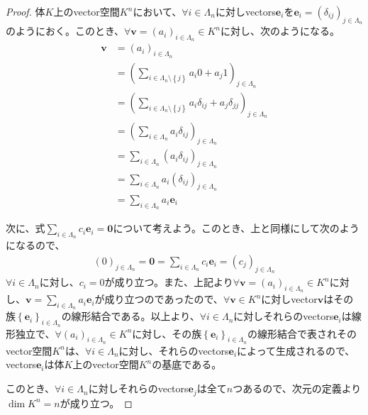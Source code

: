 \documentclass[dvipdfmx]{jsarticle}
\begin{document}
\begin{proof}
体$K$上のvector空間$K^{n}$において、$\forall i \in \varLambda_{n}$に対しvectors$\mathbf{e}_{i}$を$\mathbf{e}_{i} = \left( \delta_{ij} \right)_{j \in \varLambda_{n}}$のようにおく。このとき、$\forall\mathbf{v} = \left( a_{i} \right)_{i \in \varLambda_{n}} \in K^{n}$に対し、次のようになる。
\begin{align*}
\mathbf{v} &= \left( a_{i} \right)_{i \in \varLambda_{n}}\\
&= \left( \sum_{i \in \varLambda_{n} \setminus \left\{ j \right\}} {a_{i}0} + a_{j}1 \right)_{j \in \varLambda_{n}}\\
&= \left( \sum_{i \in \varLambda_{n} \setminus \left\{ j \right\}} {a_{i}\delta_{ij}} + a_{j}\delta_{jj} \right)_{j \in \varLambda_{n}}\\
&= \left( \sum_{i \in \varLambda_{n}} {a_{i}\delta_{ij}} \right)_{j \in \varLambda_{n}}\\
&= \sum_{i \in \varLambda_{n}} \left( a_{i}\delta_{ij} \right)_{j \in \varLambda_{n}}\\
&= \sum_{i \in \varLambda_{n}} {a_{i}\left( \delta_{ij} \right)_{j \in \varLambda_{n}}}\\
&= \sum_{i \in \varLambda_{n}} {a_{i}\mathbf{e}_{i}}
\end{align*}\par
次に、式$\sum_{i \in \varLambda_{n}} {c_{i}\mathbf{e}_{i}} = \mathbf{0}$について考えよう。このとき、上と同様にして次のようになるので、
\begin{align*}
(0)_{j \in \varLambda_{n}} = \mathbf{0} = \sum_{i \in \varLambda_{n}} {c_{i}\mathbf{e}_{i}} = \left( c_{j} \right)_{j \in \varLambda_{n}}
\end{align*}
$\forall i \in \varLambda_{n}$に対し、$c_{i} = 0$が成り立つ。また、上記より$\forall\mathbf{v} = \left( a_{i} \right)_{i \in \varLambda_{n}} \in K^{n}$に対し、$\mathbf{v} = \sum_{i \in \varLambda_{n}} {a_{i}\mathbf{e}_{i}}$が成り立つのであったので、$\forall\mathbf{v} \in K^{n}$に対しvector$\mathbf{v}$はその族$\left\{ \mathbf{e}_i \right\}_{i \in \varLambda_{n} } $の線形結合である。以上より、$\forall i \in \varLambda_{n}$に対しそれらのvectors$\mathbf{e}_{i}$は線形独立で、$\forall\left( a_{i} \right)_{i \in \varLambda_{n}} \in K^{n}$に対し、その族$\left\{ \mathbf{e}_i \right\}_{i \in \varLambda_{n} } $の線形結合で表されそのvector空間$K^{n}$は、$\forall i \in \varLambda_{n}$に対し、それらのvectors$\mathbf{e}_{i}$によって生成されるので、vectors$\mathbf{e}_{i}$は体$K$上のvector空間$K^{n}$の基底である。\par
このとき、$\forall i \in \varLambda_{n}$に対しそれらのvectors$\mathbf{e}_{j}$は全て$n$つあるので、次元の定義より$\dim K^{n} = n$が成り立つ。
\end{proof}
\end{document}
